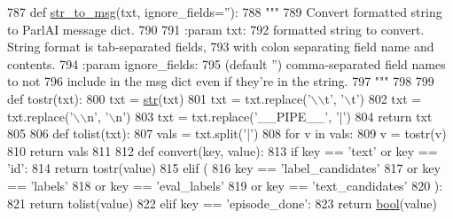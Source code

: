 \begin{DoxyCode}
787 \textcolor{keyword}{def }\hyperlink{namespaceparlai_1_1utils_1_1misc_a1b053cd9c56e6fa79b058fff587b3a48}{str\_to\_msg}(txt, ignore\_fields=''):
788     \textcolor{stringliteral}{"""}
789 \textcolor{stringliteral}{    Convert formatted string to ParlAI message dict.}
790 \textcolor{stringliteral}{}
791 \textcolor{stringliteral}{    :param txt:}
792 \textcolor{stringliteral}{        formatted string to convert. String format is tab-separated fields,}
793 \textcolor{stringliteral}{        with colon separating field name and contents.}
794 \textcolor{stringliteral}{    :param ignore\_fields:}
795 \textcolor{stringliteral}{        (default '') comma-separated field names to not}
796 \textcolor{stringliteral}{        include in the msg dict even if they're in the string.}
797 \textcolor{stringliteral}{    """}
798 
799     \textcolor{keyword}{def }tostr(txt):
800         txt = \hyperlink{namespacegenerate__task__READMEs_a5b88452ffb87b78c8c85ececebafc09f}{str}(txt)
801         txt = txt.replace(\textcolor{stringliteral}{'\(\backslash\)\(\backslash\)t'}, \textcolor{stringliteral}{'\(\backslash\)t'})
802         txt = txt.replace(\textcolor{stringliteral}{'\(\backslash\)\(\backslash\)n'}, \textcolor{stringliteral}{'\(\backslash\)n'})
803         txt = txt.replace(\textcolor{stringliteral}{'\_\_PIPE\_\_'}, \textcolor{stringliteral}{'|'})
804         \textcolor{keywordflow}{return} txt
805 
806     \textcolor{keyword}{def }tolist(txt):
807         vals = txt.split(\textcolor{stringliteral}{'|'})
808         \textcolor{keywordflow}{for} v \textcolor{keywordflow}{in} vals:
809             v = tostr(v)
810         \textcolor{keywordflow}{return} vals
811 
812     \textcolor{keyword}{def }convert(key, value):
813         \textcolor{keywordflow}{if} key == \textcolor{stringliteral}{'text'} \textcolor{keywordflow}{or} key == \textcolor{stringliteral}{'id'}:
814             \textcolor{keywordflow}{return} tostr(value)
815         \textcolor{keywordflow}{elif} (
816             key == \textcolor{stringliteral}{'label\_candidates'}
817             \textcolor{keywordflow}{or} key == \textcolor{stringliteral}{'labels'}
818             \textcolor{keywordflow}{or} key == \textcolor{stringliteral}{'eval\_labels'}
819             \textcolor{keywordflow}{or} key == \textcolor{stringliteral}{'text\_candidates'}
820         ):
821             \textcolor{keywordflow}{return} tolist(value)
822         \textcolor{keywordflow}{elif} key == \textcolor{stringliteral}{'episode\_done'}:
823             \textcolor{keywordflow}{return} \hyperlink{namespaceprojects_1_1mastering__the__dungeon_1_1mturk_1_1tasks_1_1MTD_1_1run_a6fc0c9b519a36f82b65bcd398f1fbb9d}{bool}(value)

\end{DoxyCode}
